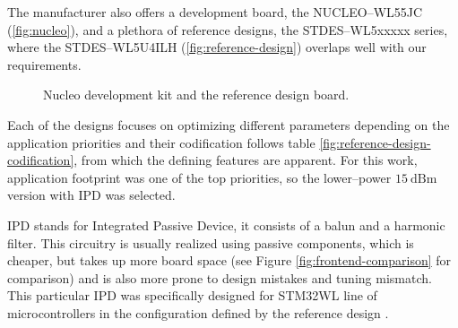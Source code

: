 The manufacturer also offers a development board, the NUCLEO--WL55JC (\ref{fig:nucleo}), and a plethora of reference designs, the STDES--WL5xxxxx series, where the STDES--WL5U4ILH (\ref{fig:reference-design}) overlaps well with our requirements.

\begin{figure}
    \centering
    \caption{\label{fig:nucleo-and-reference}Nucleo development kit and the reference design board.}
\end{figure}

Each of the designs focuses on optimizing different parameters depending on the application priorities and their codification follows table \ref{fig:reference-design-codification}, from which the defining features are apparent. For this work, application footprint was one of the top priorities, so the lower--power $15~\mathrm{dBm}$ version with IPD was selected.

IPD stands for Integrated Passive Device, it consists of a balun and a harmonic filter. This circuitry is usually realized using passive components, which is cheaper, but takes up more board space (see Figure \ref{fig:frontend-comparison} for comparison) and is also more prone to design mistakes and tuning mismatch. This particular IPD was specifically designed for STM32WL line of microcontrollers in the configuration defined by the reference design \cite{stmicroelectronics_balfhb-wl-05d3_2024}.


